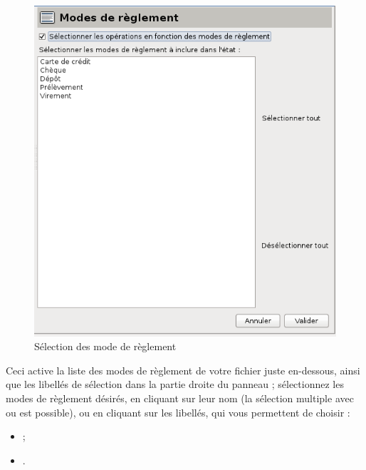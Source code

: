 \ifIllustration
\begin{figure}[h!]
\begin{center}
\includegraphics[scale=0.5]{image/screenshot/reportcreation_datas_modes}
\end{center}
\caption{Sélection des mode de règlement}
\label{reportcreation-datas-modes-img}
\end{figure}
\fi

Ceci active la liste des modes de règlement de votre fichier juste en-dessous, ainsi que les libellés de sélection dans la partie droite du panneau ; sélectionnez les modes de règlement désirés, en cliquant sur leur nom (la sélection multiple avec  ou   est possible), ou en cliquant sur les libellés, qui vous permettent de choisir :

\begin{itemize}
	  \item {} ;
	  \item {}.
\end{itemize}

\ifIllustration
\else
\fi

